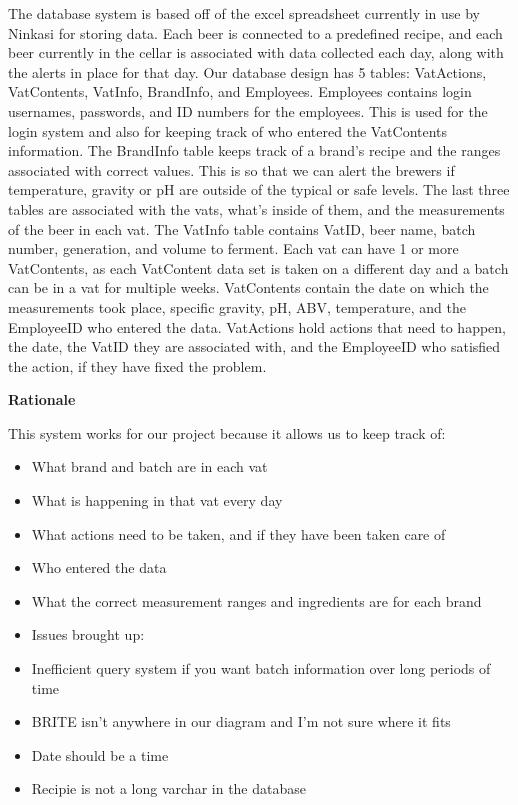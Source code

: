 \documentclass[draftclsnofoot,onecolumn,letterpaper,10pt]{IEEEtran}
\begin{document}
			The database system is based off of the excel spreadsheet currently in use by Ninkasi for storing data. Each beer is connected to a predefined recipe, and each beer currently in the cellar is associated with data collected each day, along with the alerts in place for that day.
			Our database design has 5 tables: VatActions, VatContents, VatInfo, BrandInfo, and Employees.  Employees contains login usernames, passwords, and ID numbers for the employees. This is used for the login system and also for keeping track of who entered the VatContents information.
			The BrandInfo table keeps track of a brand’s recipe and the ranges associated with correct values. This is so that we can alert the brewers if temperature, gravity or pH are outside of the typical or safe levels. The last three tables are associated with the vats, what’s inside of them, and the measurements of the beer in each vat.
			The VatInfo table contains VatID, beer name, batch number, generation, and volume to ferment. Each vat can have 1 or more VatContents, as each VatContent data set is taken on a different day and a batch can be in a vat for multiple weeks.
			VatContents contain the date on which the measurements took place, specific gravity, pH, ABV, temperature, and the EmployeeID who entered the data.
			VatActions hold actions that need to happen, the date, the VatID they are associated with, and the EmployeeID who satisfied the action, if they have fixed the problem.


			\textbf{Rationale}

			This system works for our project because it allows us to keep track of:

			\begin{itemize}
				\item What brand and batch are in each vat
				\item What is happening in that vat every day
				\item What actions need to be taken, and if they have been taken care of
				\item Who entered the data
				\item What the correct measurement ranges and ingredients are for each brand
			\end{itemize}

			\begin{itemize}
				\item Issues brought up:
				\item Inefficient query system if you want batch information over long periods of time
				\item BRITE isn’t anywhere in our diagram and I’m not sure where it fits
				\item Date should be a time
				\item Recipie is not a long varchar in the database
			\end{itemize}
\end{document}

